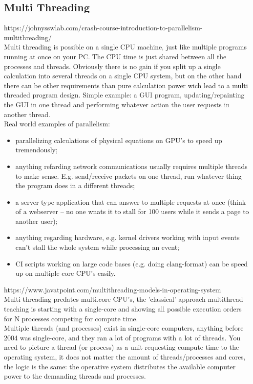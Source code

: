 \documentclass[11pt, a4paper, oneside]{article}
\theoremstyle{definition}
\begin{document}
\subsection{Multi Threading}
https://johnysswlab.com/crash-course-introduction-to-parallelism-multithreading/\\
Multi threading is possible on a single CPU machine, just like multiple programs running at once on your PC. The CPU time is just shared between all the processes and threads. Obviously there is no gain if you split up a single calculation into several threads on a single CPU system, but on the other hand there can be other requirements than pure calculation power wich lead to a multi threaded program design. Simple example: a GUI program, updating/repainting the GUI in one thread and performing whatever action the user requests in another thread.\\

Real world examples of parallelism:\\
\begin{itemize}
	\item parallelizing calculations of physical equations on GPU's to speed up tremendously;
	\item anything refarding network communications usually requires multiple threads to make sense. E.g. send/receive packets on one thread, run whatever thing the program does in a different threads;
	\item a server type application that can answer to multiple requests at once (think of a webserver -- no one wnats it to stall for 100 users while it sends a page to another user);
	\item anything regarding hardware, e.g. kernel drivers working with input events can't stall the whole system while processing an event;
	\item CI scripts working on large code bases (e.g. doing clang-format) can be speed up on multiple core CPU's easily.
\end{itemize}


https://www.javatpoint.com/multithreading-models-in-operating-system\\
Multi-threading predates multi.core CPU's, the 'classical' approach multithread teaching is starting with a single-core and showing all possible execution orders for N processes competing for compute time.\\
Multiple threads (and processes) exist in single-core computers, anything before 2004 was single-core, and they ran a lot of programs with a lot of threads. You need to picture a thread (or process) as a unit requesting compute time to the operating system, it does not matter the amount of threads/processes and cores, the logic is the same: the operative system distributes the available computer power to the demanding threads and processes.\\
\end{document}
